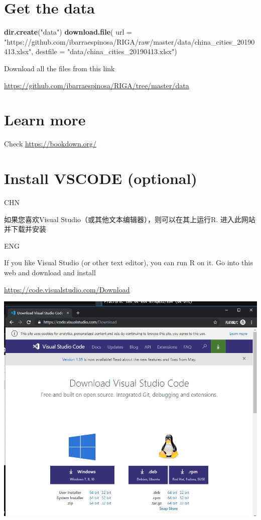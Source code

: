 \documentclass[]{book}
\newenvironment{Shaded}{\begin{snugshade}}{\end{snugshade}}
\newcommand{\DataTypeTok}[1]{\textcolor[rgb]{0.13,0.29,0.53}{#1}}
\newcommand{\KeywordTok}[1]{\textcolor[rgb]{0.13,0.29,0.53}{\textbf{#1}}}
\newcommand{\NormalTok}[1]{#1}
\newcommand{\StringTok}[1]{\textcolor[rgb]{0.31,0.60,0.02}{#1}}
\begin{document}
\hypertarget{get-the-data}{%
\section{Get the data}\label{get-the-data}}

\begin{Shaded}
\begin{Highlighting}[]
\KeywordTok{dir.create}\NormalTok{(}\StringTok{"data"}\NormalTok{)}
\KeywordTok{download.file}\NormalTok{(}
  \DataTypeTok{url =} \StringTok{"https://github.com/ibarraespinosa/RIGA/raw/master/data/china_cities_20190413.xlsx"}\NormalTok{, }
  \DataTypeTok{destfile =} \StringTok{"data/china_cities_20190413.xlsx"}\NormalTok{)}
\end{Highlighting}
\end{Shaded}

Download all the files from this link

\url{https://github.com/ibarraespinosa/RIGA/tree/master/data}

\hypertarget{learn-more}{%
\section{Learn more}\label{learn-more}}

Check \url{https://bookdown.org/}

\hypertarget{install-vscode-optional}{%
\section{Install VSCODE (optional)}\label{install-vscode-optional}}

CHN

如果您喜欢Visual Studio（或其他文本编辑器），则可以在其上运行R. 进入此网站并下载并安装

ENG

If you like Visual Studio (or other text editor), you can run R on it. Go into this web and download and install

\url{https://code.visualstudio.com/Download}

\includegraphics{fig/05.png}
\end{document}
